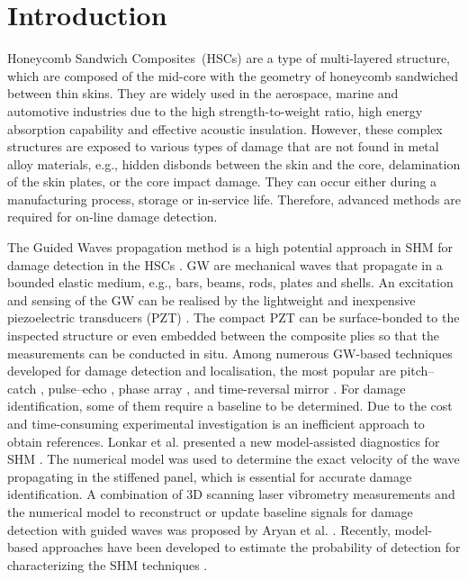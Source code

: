 \documentclass[sensors,article,submit,moreauthors,pdftex]{Definitions/mdpi}
\begin{document}
\section{Introduction}
\label{sec:intro}
Honeycomb Sandwich Composites~(HSCs) are a type of multi-layered structure, which are composed of the mid-core with the geometry of honeycomb sandwiched between thin skins.
They are widely used in the aerospace, marine and automotive industries due to the high strength-to-weight ratio, high energy absorption capability and effective acoustic insulation.
However, these complex structures are exposed to various types of damage that are not found in metal alloy materials, e.g., hidden disbonds between the skin and the core, delamination of the skin plates, or the core impact damage.
They can occur either during a manufacturing process, storage or in-service life.
Therefore, advanced methods are required for on-line damage detection.

The Guided Waves propagation method is a high potential approach in SHM for damage detection in the HSCs \cite{mustapha2011assessment, sikdar2016guided, sikdar2016ultrasonic,radzienski2016assessment, yu2019core}.
GW are mechanical waves that propagate in a bounded elastic medium, e.g., bars, beams, rods, plates and shells.
An excitation and sensing of the GW can be realised by the lightweight and inexpensive piezoelectric transducers (PZT) \cite{giurgiutiumicromechatronics}.
The compact PZT can be surface-bonded to the inspected structure or even embedded between the composite plies so that the measurements can be conducted in situ.
Among numerous GW-based techniques developed for damage detection and localisation, the most popular are pitch--catch \cite{ihn2008pitch, sikdar2017structural}, pulse--echo \cite{guo1993interaction, kudela2008damage}, phase array \cite{lu2006crack, ostachowicz2008elastic}, and time-reversal mirror \cite{fink1992time, eremin2016analytically}.
For damage identification, some of them require a baseline to be determined.
Due to the cost and time-consuming experimental investigation is an inefficient approach to obtain references.
Lonkar et al. presented a new model-assisted diagnostics for SHM \cite{lonkar2012model}.
The numerical model was used to determine the exact velocity of the wave propagating in the stiffened panel, which is essential for accurate damage identification.
A combination of 3D scanning laser vibrometry measurements and the numerical model to reconstruct or update baseline signals for damage detection with guided waves was proposed by Aryan et al. \cite{aryan2017formulation}.
Recently, model-based approaches have been developed to estimate the probability of detection for characterizing the SHM techniques \cite{janapati2016damage, moriot2018model, tschoke2021feasibility, gao2022model}. 
 
\end{document}
